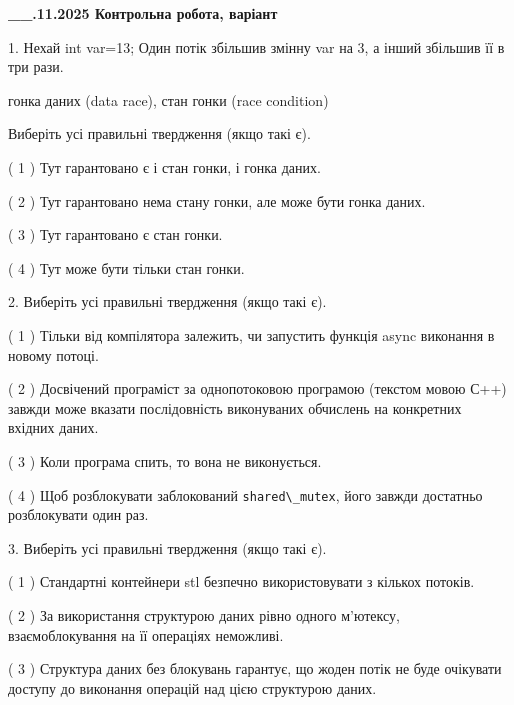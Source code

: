 \documentclass[12pt, ukrainian]{article}
\def\code#1{\Verb!#1!}
\begin{document}
\newpage
\begin {large}

\textbf{\_\_.11.2025 Контрольна робота, варіант  }\par


{
1. Нехай int var=13; Один потік збільшив змінну var на 3, а інший збільшив її в три рази.

гонка даних (data race), стан гонки (race condition)

Виберіть усі правильні твердження (якщо такі є).\par
\vspace{2mm}
( 1 ) Тут гарантовано є і стан гонки, і гонка даних.%

( 2 ) Тут гарантовано нема стану гонки, але може бути гонка даних.%

( 3 ) Тут гарантовано є стан гонки.%

( 4 ) Тут може бути тільки стан гонки.%


2. Виберіть усі правильні твердження (якщо такі є).\par
\vspace{2mm}

( 1 ) Тільки від компілятора залежить, чи запустить функція async виконання в новому потоці.%

( 2 ) Досвічений програміст за однопотоковою програмою (текстом мовою С++) завжди може вказати послідовність виконуваних обчислень на конкретних вхідних даних.%

( 3 ) Коли програма спить, то вона не виконується.%

( 4 ) Щоб розблокувати заблокований \code{shared\_mutex}, його завжди достатньо розблокувати один раз.%


3. Виберіть усі правильні твердження (якщо такі є).\par
\vspace{2mm}

( 1 ) Стандартні контейнери stl безпечно використовувати з кількох потоків.%

( 2 ) За використання структурою даних рівно одного м’ютексу, взаємоблокування на її операціях неможливі.%

( 3 ) Структура даних без блокувань гарантує, що жоден потік не буде очікувати доступу до виконання операцій над цією структурою даних.%

}
\end{large}
\end{document}
